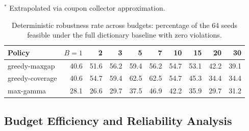 \documentclass[accepted]{uai2026}
\theoremstyle{plain}
\theoremstyle{definition}
\theoremstyle{remark}
\begin{document}
\begin{table}[ht] %
\centering
\caption{\textbf{Minimum budget for target coverage ($\tau=0.99$).}
Greedy reaches the target with small budgets ($B \le 20$), while Random requires orders of magnitude more (extrapolated estimates $^\ast$).}
\label{tab:minB_target}
\vspace{4pt} %
{}
\vspace{2pt}
\scriptsize{$^\ast$ Extrapolated via coupon collector approximation.}
\end{table}
% 
\begin{table}[t]
\centering\small
\caption{Deterministic robustness rate across budgets: percentage of the 64 seeds feasible under the full dictionary baseline with zero violations.}
\label{tab:det_success_oral}
\begin{tabular}{lrrrrrrrrr}
\toprule
Policy & $B{=}1$ & 2 & 3 & 5 & 7 & 10 & 15 & 20 & 30 \\
\midrule
greedy-maxgap   & 40.6 & 51.6 & 56.2 & 59.4 & 56.2 & 54.7 & 53.1 & 42.2 & 39.1 \\
greedy-coverage & 40.6 & 54.7 & 59.4 & 62.5 & 62.5 & 54.7 & 45.3 & 34.4 & 34.4 \\
max-gamma       & 28.1 & 26.6 & 29.7 & 37.5 & 46.9 & 42.2 & 35.9 & 29.7 & 31.2 \\
\bottomrule
\end{tabular}
\end{table}

\subsection{Budget Efficiency and Reliability Analysis}
\label{sec:synthetic_results}
\end{document}
